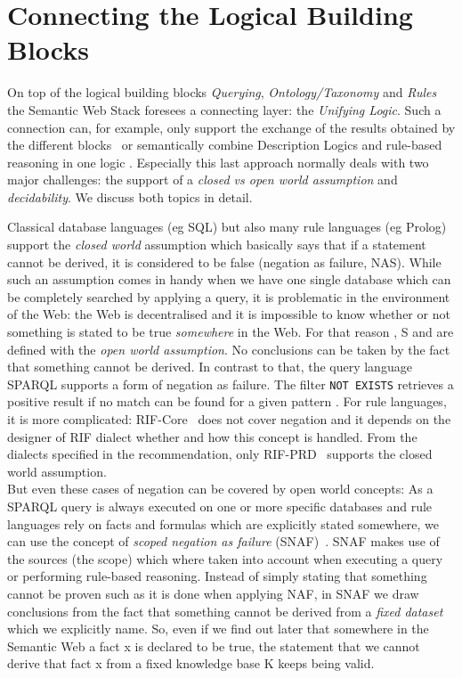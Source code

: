 \section{Connecting the Logical Building Blocks}
On top of the logical building blocks \emph{Querying}, \emph{Ontology/Taxonomy} and \emph{Rules} the Semantic Web Stack foresees a connecting layer: 
the \emph{Unifying Logic}. 
Such a connection can, for example, only support the exchange of the results obtained by the different blocks~\cite{rearch} 
or semantically combine Description Logics and rule-based reasoning in one logic \cite{DLP,knorr,unilogic,DLASP,owlandrules}. 
Especially this last approach normally deals with two major challenges: 
the support of a \emph{closed vs open world assumption} and \emph{decidability}. We discuss both topics in detail.


Classical database languages (eg SQL)  but also many rule languages (eg Prolog) support the \emph{closed world} assumption which basically says that if a statement cannot 
be derived, 
it is considered to be false (negation as failure, NAS). While such an assumption comes in handy when we have one single database which can be completely searched by applying a query, 
it is problematic 
in the environment of the Web: the Web is decentralised and it is impossible to know whether or not something is stated to be true \emph{somewhere} in the Web.
For that reason \rdf, \rdf{}S and \owl are defined with the \emph{open world assumption}. No conclusions can be taken by the fact that something cannot be derived. 
In contrast to that, the query language SPARQL supports a form of negation as failure. The
filter \texttt{NOT EXISTS} retrieves a positive result if no match can be found for a given pattern \cite[Section 8]{sparql}.
For rule languages, it is more complicated:
RIF-Core~\cite{rifcore} does not cover negation and it depends on the designer of RIF dialect whether and how this concept is handled. From the dialects 
specified in the \wwwc recommendation, only RIF-PRD~\cite{rifprd} supports the closed world assumption. \\
But even these cases of negation can be covered by open world concepts: As a SPARQL query is always executed on one or more specific databases and 
rule languages rely on facts and formulas which are explicitly stated somewhere, we  
can use the concept of \emph{scoped negation as failure} (SNAF)~\cite{rearch,snaf1,snaf2}. SNAF makes use of the sources (the scope) 
which where taken into account when executing a 
query or performing rule-based reasoning. Instead of simply stating that something cannot be proven such as it is done when applying NAF, in SNAF  we
draw conclusions from the fact that something cannot be derived from a \emph{fixed dataset} which we explicitly name. 
So, even if we find out later that somewhere in the Semantic Web a fact x is declared to be true, 
the statement that we cannot derive that fact x from a fixed knowledge base K 
keeps being valid.  


